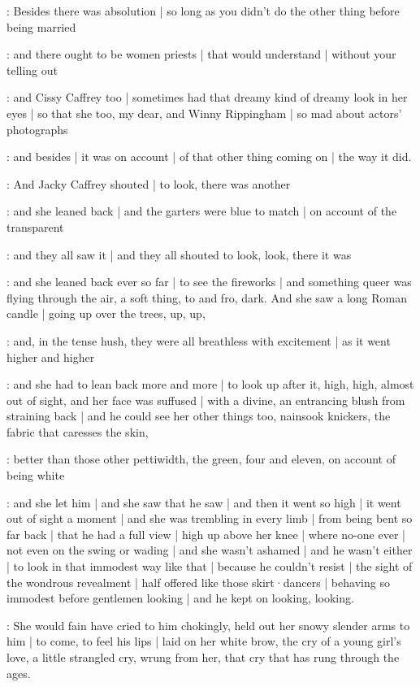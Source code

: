 \gertyJudgy:
Besides there was absolution |
so long as you didn't do the other thing before being married

\gertyReal:
and there ought to be women priests |%
that would understand |
without your telling out

\gertyNovel:
and Cissy Caffrey too |
sometimes had that dreamy kind of dreamy look in her eyes |
so that she too,
my dear,
and Winny Rippingham |
so mad about actors' photographs

\gertyReal:
and besides |
it was on account |
of that other thing coming on |
the way it did.

:
And Jacky Caffrey shouted |
to look,
there was another

\gertySex:
and she leaned back |
and the garters were blue to match |
on account of the transparent

:
and they all saw it |
and they all shouted to look,
look,
there it was

\gertySex:
and she leaned back ever so far |
to see the fireworks |
and something queer was flying through the air,
a soft thing,
to and fro,
dark.
And she saw a long Roman candle |
going up over the trees,%
up,
up,

:
and,
in the tense hush,
they were all breathless with excitement |
as it went higher and higher

\gertySex:
and she had to lean back more and more |
to look up after it,
high,
high,
almost out of sight,
and her face was suffused |
with a divine,
an entrancing blush from straining back |
and he could see her other things too,
nainsook knickers,
the fabric that caresses the skin,

\gertyReal:
better than those other pettiwidth,
the green,
four and eleven,
on account of being white

\gertySex:
and she let him |
and she saw that he saw |
and then it went so high |
it went out of sight a moment |
and she was trembling in every limb |
from being bent so far back |
that he had a full view |
high up above her knee |
where no-one ever |
not even on the swing or wading |
and she wasn't ashamed |
and he wasn't either |%
to look in that immodest way like that |
because he couldn't resist |
the sight of the wondrous revealment |
half offered like those skirt·dancers |
behaving so immodest before gentlemen looking |
and he kept on looking,
looking.

\gertyNovel:
She would fain have cried to him
chokingly,
held out her snowy slender arms to him |
to come,
to feel his lips |
laid on her white brow,
the cry of a young girl's love,
a little strangled cry,
wrung from her,
that cry
that has rung through the ages.

